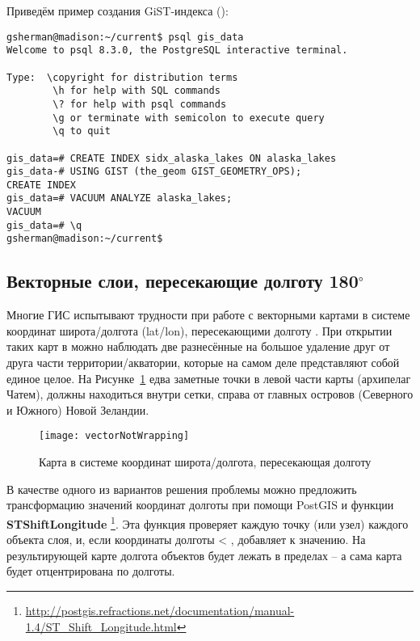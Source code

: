 Приведём пример создания GiST-индекса (\nix):
\begin{verbatim}
gsherman@madison:~/current$ psql gis_data
Welcome to psql 8.3.0, the PostgreSQL interactive terminal.

Type:  \copyright for distribution terms
        \h for help with SQL commands
        \? for help with psql commands
        \g or terminate with semicolon to execute query
        \q to quit

gis_data=# CREATE INDEX sidx_alaska_lakes ON alaska_lakes
gis_data-# USING GIST (the_geom GIST_GEOMETRY_OPS);
CREATE INDEX
gis_data=# VACUUM ANALYZE alaska_lakes;
VACUUM
gis_data=# \q
gsherman@madison:~/current$
\end{verbatim}

\subsection{Векторные слои, пересекающие долготу 180$^\circ$}

Многие ГИС испытывают трудности при работе с векторными картами в системе
координат широта/долгота (lat/lon), пересекающими долготу .
При открытии таких карт в \qg можно наблюдать две разнесённые на большое
удаление друг от друга части территории/акватории, которые на самом деле
представляют собой единое целое. На Рисунке~\ref{fig:vector_not_wrapping}
едва заметные точки в левой части карты (архипелаг Чатем), должны
находиться внутри сетки, справа от главных островов (Северного и Южного)
Новой Зеландии.

\begin{figure}[ht]
   \centering
   \texttt{[image: vectorNotWrapping]}
      \caption{Карта в системе координат широта/долгота, пересекающая долготу  \wincaption}
   \label{fig:vector_not_wrapping}
\end{figure}

В качестве одного из вариантов решения проблемы можно предложить трансформацию
значений координат долготы при помощи PostGIS и функции
\textbf{ST\textunderscore Shift\textunderscore Longitude}
\footnote{\url{http://postgis.refractions.net/documentation/manual-1.4/ST\_Shift\_Longitude.html}}.
Эта функция проверяет каждую точку (или узел) каждого объекта слоя, и,
если координаты долготы < , добавляет  к значению.
На результирующей карте долгота объектов будет лежать в пределах
 --  а сама карта будет отцентрирована по
 долготы.

